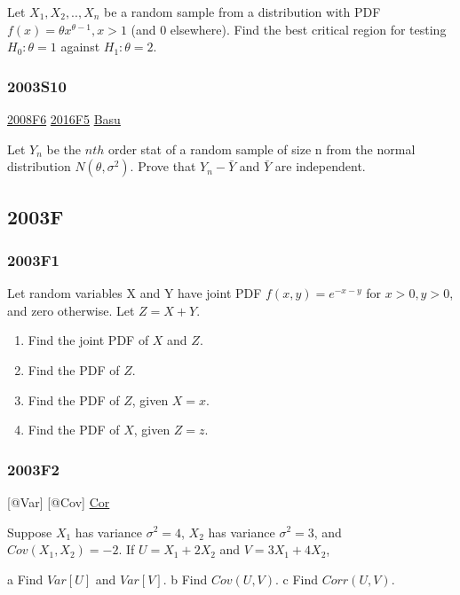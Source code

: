 \documentclass[10pt,twocolumn,portrait]{article}
\begin{document}
Let \(X_1,X_2,..,X_n\) be a random sample from a distribution with PDF
\(f(x)=\theta x^{\theta-1}, x>1\) (and 0 elsewhere). Find the best
critical region for testing \(H_0:\theta=1\) against \(H_1:\theta=2\).

\hypertarget{s10}{%
\subsubsection{2003S10}\label{s10}}

\protect\hyperlink{f6-3}{2008F6} \protect\hyperlink{f5-6}{2016F5}
\protect\hyperlink{Basu}{Basu}

Let \(Y_n\) be the \(n{th}\) order stat of a random sample of size n
from the normal distribution \(N(\theta,\sigma^2)\). Prove that
\(Y_n-\bar Y\) and \(\bar Y\) are independent.

\hypertarget{f-1}{%
\subsection{2003F}\label{f-1}}

\hypertarget{f1-1}{%
\subsubsection{2003F1}\label{f1-1}}

Let random variables X and Y have joint PDF \(f(x,y)=e^{-x-y}\) for
\(x>0, y>0\), and zero otherwise. Let \(Z=X+Y\).

\begin{enumerate}
\def\labelenumi{\Alph{enumi})}
\item
  Find the joint PDF of \(X\) and \(Z\).
\item
  Find the PDF of \(Z\).
\item
  Find the PDF of \(Z\), given \(X=x\).
\item
  Find the PDF of \(X\), given \(Z=z\).
\end{enumerate}

\hypertarget{f2-1}{%
\subsubsection{2003F2}\label{f2-1}}

{[}@Var{]} {[}@Cov{]} \protect\hyperlink{Cor}{Cor}

Suppose \(X_1\) has variance \(\sigma^2=4\), \(X_2\) has variance
\(\sigma^2=3\), and \(Cov(X_1,X_2)=-2\). If \(U=X_1+2X_2\) and
\(V= 3X_1+4X_2\),

a Find \(Var[U]\) and \(Var[V]\). b Find \(Cov(U,V)\). c Find
\(Corr(U,V)\).
\end{document}
